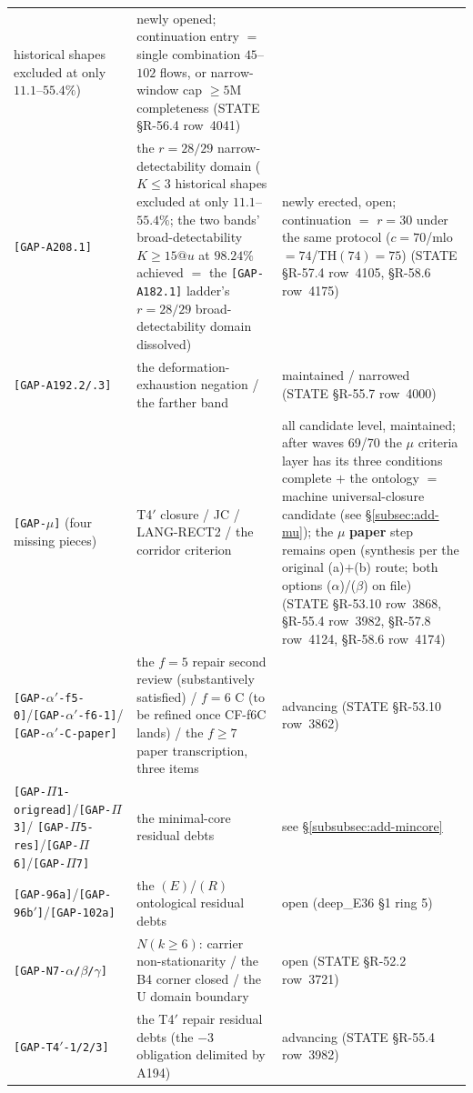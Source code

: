 \begin{longtable}{p{}p{}p{}}
historical shapes excluded at only $11.1$--$55.4\%$) & newly opened;
continuation entry $=$ single combination $45$--$102$ flows, or
narrow-window cap $\ge5$M completeness (STATE \S R-56.4 row~4041) \\
\texttt{[GAP-A208.1]} & the $r=28/29$ narrow-detectability domain ($K\le3$
historical shapes excluded at only $11.1$--$55.4\%$; the two bands'
broad-detectability $K\ge15@u$ at $98.24\%$ achieved $=$ the
\texttt{[GAP-A182.1]} ladder's $r=28/29$ broad-detectability domain
dissolved) & newly erected, open; continuation $=$ $r=30$ under the same
protocol ($c=70$/mlo$=74$/TH$(74)=75$) (STATE \S R-57.4 row~4105, \S R-58.6
row~4175) \\
\texttt{[GAP-A192.2/.3]} & the deformation-exhaustion negation / the farther
band & maintained / narrowed (STATE \S R-55.7 row~4000) \\
\texttt{[GAP-$\mu$]} (four missing pieces) & T4$'$ closure / JC /
LANG-RECT2 / the corridor criterion & all candidate level, maintained;
after waves 69/70 the $\mu$ criteria layer has its three conditions complete
$+$ the ontology $=$ machine universal-closure candidate (see
\S\ref{subsec:add-mu}); the $\mu$ \textbf{paper} step remains open (synthesis
per the original (a)$+$(b) route; both options ($\alpha$)/($\beta$) on
file) (STATE \S R-53.10 row~3868, \S R-55.4 row~3982, \S R-57.8 row~4124,
\S R-58.6 row~4174) \\
\texttt{[GAP-$\alpha'$-f5-0]}/\texttt{[GAP-$\alpha'$-f6-1]}/
\texttt{[GAP-$\alpha'$-C-paper]} & the $f=5$ repair second review
(substantively satisfied) / $f=6$ C (to be refined once CF-f6C lands) / the
$f\ge7$ paper transcription, three items & advancing (STATE \S R-53.10
row~3862) \\
\texttt{[GAP-$\Pi$1-origread]}\slash\texttt{[GAP-$\Pi$3]}\slash
\texttt{[GAP-$\Pi$5-res]}\slash\texttt{[GAP-$\Pi$6]}\slash\texttt{[GAP-$\Pi$7]} &
the minimal-core residual debts & see \S\ref{subsubsec:add-mincore} \\
\texttt{[GAP-96a]}\slash\texttt{[GAP-96b$'$]}\slash\texttt{[GAP-102a]} & the
$(E)$/$ (R)$ ontological residual debts & open (deep\_E36 \S1 ring 5) \\
\texttt{[GAP-N7-$\alpha$/$\beta$/$\gamma$]} & $N(k\ge6)$: carrier
non-stationarity / the B4 corner closed / the U domain boundary & open
(STATE \S R-52.2 row~3721) \\
\texttt{[GAP-T4$'$-1/2/3]} & the T4$'$ repair residual debts (the $-3$
obligation delimited by A194) & advancing (STATE \S R-55.4 row~3982) \\

\end{longtable}

